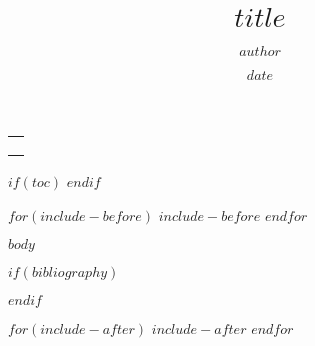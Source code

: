 \documentclass[
$if(fontsize)$
$fontsize$,
$endif$
$if(lang)$
$babel-lang$,
$endif$
$for(classoption)$
$classoption$$sep$,
$endfor$
a4paper]{article}
\title{$title$}
\author{$author$}
\date{$date$}
\makeatletter
\newcommand\BackgroundPic{%
	\put(0,0){%
		\parbox[b][\paperheight]{\paperwidth}{%
			\vfill
			\centering
			\texttt{[image: \\cover]}%
			\vfill
}}}
\renewcommand{\maketitle}{
	\thispagestyle{customtitle}
	\AddToShipoutPicture*{\BackgroundPic}
	\ClearShipoutPicture

	\phantom{a}\hfill
	\vspace{13cm}

	\begin{tabular}[l]{@{}p{\textwidth}@{}}
		\color{bluegray}\headingfont\Huge\@title\\[1em]
		\color{bluegray}\headingfont\LARGE\@author\\[1em]
		\color{bluegray}\headingfont\large\@date\\[1em]
	\end{tabular}


	\clearpage
}
\renewcommand{\maketitle}{
	\thispagestyle{customtitle}
	\phantom{a}\hfill
	\vspace{13cm}

	\begin{tabular}[l]{@{}p{\textwidth}@{}}
		\color{bluegray}\headingfont\Huge\@title\\[1em]
		\color{bluegray}\headingfont\LARGE\@author\\[1em]
		\color{bluegray}\headingfont\large\@date\\[1em]
	\end{tabular}


	\clearpage
}
\makeatother
\begin{document}
\maketitle

$if(toc)$
\tableofcontents
\clearpage
$endif$

$for(include-before)$
  $include-before$
$endfor$

$body$

\clearpage

$if(bibliography)$
  
  
$endif$


$for(include-after)$
  $include-after$
$endfor$
\end{document}
